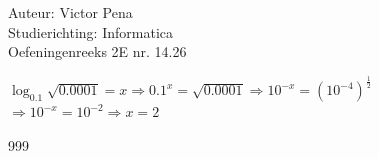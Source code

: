 \documentclass[a4paper]{article}
\begin{document}
	
	\noindent \large Auteur: Victor Pena \\
	\noindent \large Studierichting: Informatica\\
	\noindent \large Oefeningenreeks 2E nr. 14.26\\
	
	\medskip
	
	\normalsize 
	
	$\log_{0.1}\sqrt{0.0001} = x \Rightarrow 0.1^x = \sqrt{0.0001} \Rightarrow 10^{-x} = (10^{-4})^{\tfrac{1}{2}}$\\
	
	$ \Rightarrow 10^{-x} = 10^{-2} \Rightarrow x = 2$   \\
	
	
	\begin{thebibliography}{999}
	\end{thebibliography}
\end{document}
